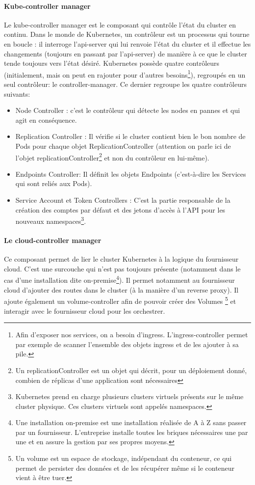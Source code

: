 \documentclass[11pt,fleqn]{book} %
\begin{document}
\paragraph*{Kube-controller manager}
Le kube-controller manager est le composant qui contrôle l'état du cluster en continu. Dans le monde de Kubernetes, un contrôleur est un processus qui tourne en boucle : il interroge l'api-server qui lui renvoie l'état du cluster et il effectue les changements (toujours en passant par l'api-server) de manière à ce que le cluster tende toujours vers l'état désiré. Kubernetes possède quatre contrôleurs (initialement, mais on peut en rajouter pour d'autres besoins\footnote{Afin d'exposer nos services, on a besoin d'ingress. L'ingress-controller permet par exemple de scanner l'ensemble des objets ingress et de les ajouter à sa pile.}), regroupés en un seul contrôleur: le controller-manager. Ce dernier regroupe les quatre contrôleurs suivants: 
\begin{itemize}
    \item Node Controller : c'est le contrôleur qui détecte les nodes en pannes et qui agit en conséquence.
    \item Replication Controller : Il vérifie si le cluster contient bien le bon nombre de Pods pour chaque objet ReplicationController (attention on parle ici de l'objet replicationController\footnote{Un replicationController est un objet qui décrit, pour un déploiement donné, combien de réplicas d'une application sont nécessaires} et non du contrôleur en lui-même).
    \item Endpoints Controller: Il définit les objets Endpoints (c’est-à-dire les Services qui sont reliés aux Pods).
    \item Service Account et Token Controllers : C'est la partie responsable de la création des comptes par défaut et des jetons d'accès à l'API pour les nouveaux namespaces\footnote{Kubernetes prend en charge plusieurs clusters virtuels présents sur le même cluster physique. Ces clusters virtuels sont appelés namespaces.}.
\end{itemize}

\paragraph{Le cloud-controller manager}
Ce composant permet de lier le cluster Kubernetes à la logique du fournisseur cloud. C'est une surcouche qui n'est pas toujours présente (notamment dans le cas d'une installation dite on-premise\footnote{Une installation on-premise est une installation réalisée de A à Z sans passer par un fournisseur. L'entreprise installe toutes les briques nécessaires une par une et en assure la gestion par ses propres moyens.}). Il permet notamment au fournisseur cloud d'ajouter des routes dans le cluster (à la manière d'un reverse proxy). Il ajoute également un volume-controller afin de pouvoir créer des Volumes \footnote{Un volume est un espace de stockage, indépendant du conteneur, ce qui permet de persister des données et de les récupérer même si le conteneur vient à être tuer.} et interagir avec le fournisseur cloud pour les orchestrer.
\end{document}
